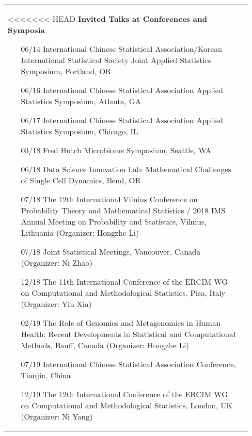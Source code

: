 \documentclass[10pt]{article}
\begin{document}
\begin{table}[H]
\begin{tabular}{p{1.6cm}p{12cm}}
<<<<<<< HEAD
\textbf{Invited Talks at Conferences and Symposia}
\begin{enumerate}  
\item[06/14] International Chinese Statistical Association/Korean International Statistical Society Joint Applied Statistics Symposium, Portland, OR 
\item[06/16] International Chinese Statistical Association Applied Statistics Symposium, Atlanta, GA 
\item[06/17] International Chinese Statistical Association Applied Statistics Symposium, Chicago, IL
\item[03/18] Fred Hutch Microbiome Symposium, Seattle, WA 
\item[06/18] Data Science Innovation Lab: Mathematical Challenges of Single Cell Dynamics, Bend, OR
\item[07/18] The 12th International Vilnius Conference on Probability Theory and Mathematical Statistics / 2018 IMS Annual Meeting on Probability and Statistics, Vilnius, Lithuania (Organizer: Hongzhe Li)
\item[07/18] Joint Statistical Meetings, Vancouver, Canada (Organizer: Ni Zhao)
\item[12/18] The 11th International Conference of the ERCIM WG on Computational and Methodological Statistics, Pisa, Italy (Organizer: Yin Xia)
\item[02/19] The Role of Genomics and Metagenomics in Human Health: Recent Developments in Statistical and Computational Methods, Banff, Canada (Organizer: Hongzhe Li)
\item[07/19] International Chinese Statistical Association Conference, Tianjin, China
\item[12/19] The 12th International Conference of the ERCIM WG on Computational and Methodological Statistics, London, UK (Organizer: Ni Yang)

\end{enumerate}
\end{tabular}
\end{table}
\end{document}
